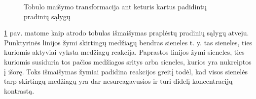 \begin{figure}[!h]
\caption{Tobulo maišymo transformacija ant keturis kartus padidintų pradinių sąlygų}
\label{perfect-4x4-mix}
\end{figure}
\ref{perfect-4x4-mix} pav. matome kaip atrodo tobulas išmaišymas praplėstų pradinių sąlygų atveju. Punktyrinės linijos žymi skirtingų medžiagų bendras sieneles t. y. tas sieneles, ties kuriomis aktyviai vyksta medžiagų reakcija. Paprastos linijos žymi sieneles, ties kuriomis susiduria tos pačios medžiagos sritys arba sieneles, kurios yra nukreiptos į išorę. Toks išmaišymas žymiai padidina reakcijos greitį todėl, kad visos sienelės tarp skirtingų medžiagų yra dar nesureagavusios ir turi didelį koncentracijų kontrastą.
